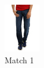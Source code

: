 \begin{figure}[H]
\begin{subfigure}[b]{0.19\textwidth}
      \includegraphics[width=\textwidth]{images/output2.jpeg}
      \caption{Match 1}
  \end{subfigure}
  \begin{subfigure}[b]{0.19\textwidth}

\end{subfigure}
\end{figure}
